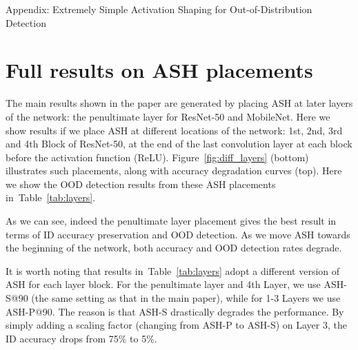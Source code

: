 \documentclass{article}
\newcommand{\figref}[1]{Figure~\ref{fig:#1}}
\newcommand{\seclabel}[1]{\label{sec:#1}}
\newcommand{\tabref}[1]{Table~\ref{tab:#1}}
\begin{document}


\newpage
\appendix






\begin{center}

\LARGE \sc Appendix: Extremely Simple Activation Shaping for Out-of-Distribution Detection

\end{center}

\section{Full results on ASH placements}
\seclabel{appendix_ash_placement}
The main results shown in the paper are generated by placing ASH at later layers of the network: the penultimate layer for ResNet-50 and MobileNet. Here we show results if we place ASH at different locations of the network: 1st, 2nd, 3rd and 4th Block of ResNet-50, at the end of the last convolution layer at each block before the activation function (ReLU). \figref{diff_layers} (bottom) illustrates such placements, along with accuracy degradation curves (top). Here we show the OOD detection results from these ASH placements in~\tabref{layers}.

As we can see, indeed the penultimate layer placement gives the best result in terms of ID accuracy preservation and OOD detection. As we move ASH towards the beginning of the network, both accuracy and OOD detection rates degrade.

It is worth noting that results in~\tabref{layers} adopt a different version of ASH for each layer block. For the penultimate layer and 4th Layer, we use ASH-S@90 (the same setting as that in the main paper), while for 1-3 Layers we use ASH-P@90. The reason is that ASH-S drastically degrades the performance. By simply adding a scaling factor (changing from ASH-P to ASH-S) on Layer 3, the ID accuracy drops from 75\% to 5\%.
\end{document}
